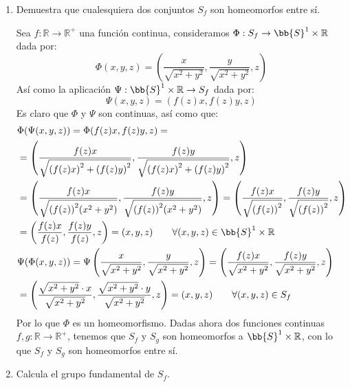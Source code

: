 \begin{ejercicio}
\begin{enumerate}[label=\alph*)]
\begin{figure}[h]
                \caption{Sólido de revolución $S_f$.}
                \label{fig:2.1.13}
            \end{figure}
            

        \item Demuestra que cualesquiera dos conjuntos $S_f$ son homeomorfos entre sí.

            Sea $f:\mathbb{R}\to \mathbb{R}^+$ una función continua, consideramos $\Phi:S_f\to \bb{S}^1\times \mathbb{R}$ dada por:
            \begin{equation*}
                \Phi(x,y,z) = \left(\frac{x}{\sqrt{x^2+y^2}}, \frac{y}{\sqrt{x^2+y^2}}, z\right)
            \end{equation*}
            Así como la aplicación $\Psi:\bb{S}^1\times \mathbb{R}\to S_f$ dada por:
            \begin{equation*}
                \Psi(x,y,z) = (f(z)x, f(z)y, z)
            \end{equation*}
            Es claro que $\Phi$ y $\Psi$ son continuas, así como que:
            \begin{align*}
                &\Phi(\Psi(x,y,z)) = \Phi(f(z)x, f(z)y, z) = \\ 
                &=\left(\frac{f(z)x}{\sqrt{{(f(z)x)}^{2} + {(f(z)y)}^{2}}}, \frac{f(z)y}{\sqrt{{(f(z)x)}^{2} + {(f(z)y)}^{2}}}, z\right)\\
                &=\left(\frac{f(z)x}{\sqrt{{(f(z))}^{2}(x^2+y^2)}}, \frac{f(z)y}{\sqrt{{(f(z))}^{2}(x^2+y^2)}}, z\right) =\left(\frac{f(z)x}{\sqrt{{(f(z))}^{2}}}, \frac{f(z)y}{\sqrt{{(f(z))}^{2}}}, z\right)\\
                &=\left(\frac{f(z)x}{f(z)}, \frac{f(z)y}{f(z)}, z\right) = (x,y,z) \qquad \forall (x,y,z)\in \bb{S}^1\times \mathbb{R} \\
                &\Psi(\Phi(x,y,z)) = \Psi\left(\frac{x}{\sqrt{x^2+y^2}}, \frac{y}{\sqrt{x^2+y^2}}, z\right)= \left(\frac{f(z)x}{\sqrt{x^2+y^2}}, \frac{f(z)y}{\sqrt{x^2+y^2}}, z\right) \\
                &= \left(\frac{\sqrt{x^2+y^2}\cdot x}{\sqrt{x^2+y^2}}, \frac{\sqrt{x^2+y^2}\cdot y}{\sqrt{x^2+y^2}}, z\right)  = (x,y,z) \qquad \forall (x,y,z)\in S_f
            \end{align*}
            Por lo que $\Phi$ es un homeomorfismo. Dadas ahora dos funciones continuas $f,g:\mathbb{R}\to \mathbb{R}^+$, tenemos que $S_f$ y $S_g$ son homeomorfos a $\bb{S}^1\times \mathbb{R}$, con lo que $S_f$ y $S_g$ son homeomorfos entre sí.
        \item Calcula el grupo fundamental de $S_f$.


\end{enumerate}
\end{ejercicio}
